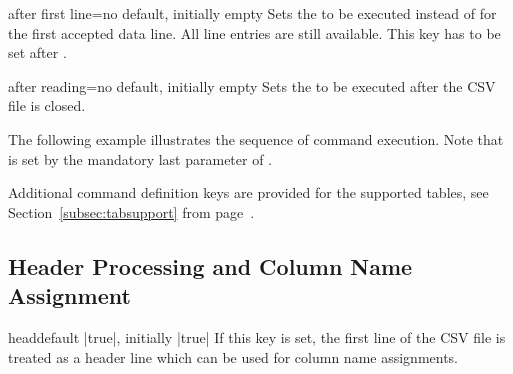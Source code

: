 \documentclass[a4paper,11pt]{ltxdoc}
\begin{document}
\begin{docCsvKey}{after first line}{=}{no default, initially empty}
  Sets the  to be executed instead of 
  for the first accepted data line.
  All line entries are still available.
  This key has to be set after .
\end{docCsvKey}

\begin{docCsvKey}{after reading}{=}{no default, initially empty}
  Sets the  to be executed after the CSV file is closed.
\end{docCsvKey}

\bigskip

The following example illustrates the sequence of command execution.
Note that  is set by the mandatory last
parameter of .

\begin{dispExample}
%
\end{dispExample}

Additional command definition keys are provided for the supported tables,
see Section~\ref{subsec:tabsupport} from page~\pageref{subsec:tabsupport}.

\clearpage
\subsection{Header Processing and Column Name Assignment}%

\begin{docCsvKey}{head}{}{default |true|, initially |true|}
  If this key is set, the first line of the CSV file is treated as a header
  line which can be used for column name assignments.
\end{docCsvKey}
\end{document}
